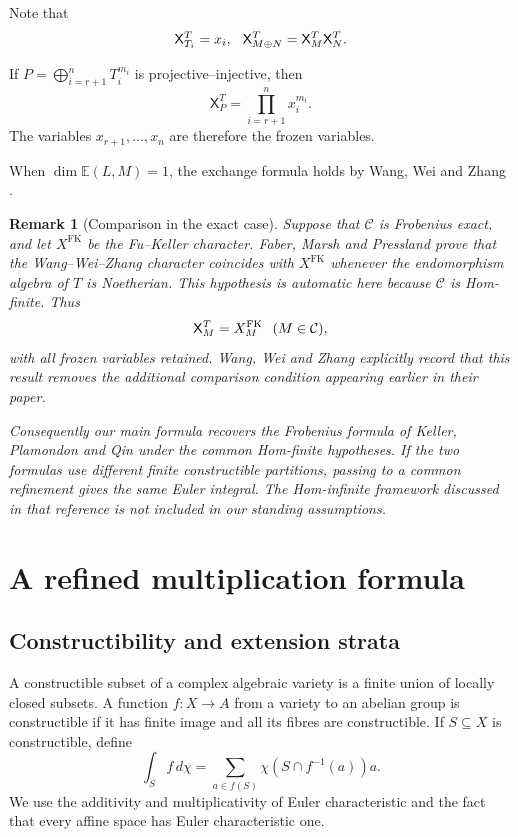\documentclass[11pt,reqno]{article}
\numberwithin{equation}{section}
\newtheorem{remark}[remark]{Remark}
\theoremstyle{definition}
\newcommand{\C}{\mathcal C}
\newcommand{\E}{\mathbb E}
\newcommand{\X}{\mathsf X}
\begin{document}
Note that
\[
  \X^T_{T_i}=x_i,
 \hspace{2.5mm}
  \X^T_{M\oplus N}=\X^T_M\X^T_N.
\]

If $P=\bigoplus_{i=r+1}^nT_i^{m_i}$ is projective--injective, then
\[
 \X^T_P=\prod_{i=r+1}^n x_i^{m_i}.
\]
The variables $x_{r+1},\ldots,x_n$ are therefore the frozen variables.

When $\dim\E(L,M)=1$, the exchange formula holds by Wang, Wei and Zhang \cite[Theorem~4.4]{WangWeiZhangCC}.

\begin{remark}[Comparison in the exact case]\label{rem:exact-comparison}
Suppose that $\C$ is Frobenius exact, and let $X^{\mathrm{FK}}$ be the
Fu--Keller character. Faber, Marsh and Pressland
\cite[Proposition~5.4]{FaberMarshPressland} prove that the Wang--Wei--Zhang
character coincides with $X^{\mathrm{FK}}$ whenever the endomorphism algebra
of $T$ is Noetherian. This hypothesis is automatic here because $\C$ is
Hom-finite. Thus
\[
 \X^T_M=X^{\mathrm{FK}}_M\hspace{2.5mm}(M\in\C),
\]
with all frozen variables retained. Wang, Wei and Zhang
\cite[Remark~4.10]{WangWeiZhangCC} explicitly record that this result removes
the additional comparison condition appearing earlier in their paper.

Consequently our main formula recovers the Frobenius formula of Keller,
Plamondon and Qin \cite[Theorem~3.6]{KellerPlamondonQin} under the common
Hom-finite hypotheses. If the two formulas use different finite constructible
partitions, passing to a common refinement gives the same Euler integral.
The Hom-infinite framework discussed in that reference is not included in
our standing assumptions.
\end{remark}

\section{A refined multiplication formula}\label{multiplication}
\subsection{Constructibility and extension strata}
A constructible subset of a complex algebraic variety is a finite union of locally closed subsets.  A function $f\colon X\to A$ from a variety to an abelian group is constructible if it has finite image and all its fibres are constructible.  If $S\subseteq X$ is constructible, define
\[
 \int_S f\,d\chi
 =\sum_{a\in f(S)}\chi(S\cap f^{-1}(a))a.
\]
We use the additivity and multiplicativity of Euler characteristic and the fact that every affine space has Euler characteristic one.
\end{document}
